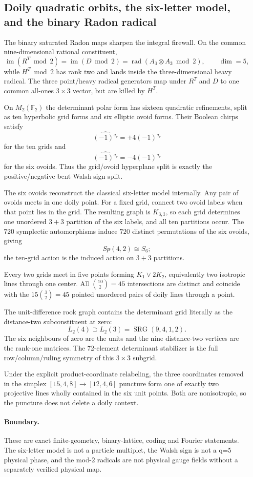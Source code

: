 \subsection*{Doily quadratic orbits, the six-letter model, and the binary Radon radical}

The binary saturated Radon maps sharpen the integral firewall. On the common
nine-dimensional rational constituent,
\[
\operatorname{im}(R^T\bmod2)=\operatorname{im}(D\bmod2)
=\operatorname{rad}(A_3\otimes A_3\bmod2),\qquad \dim=5,
\]
while $H^T\bmod2$ has rank two and lands inside the three-dimensional heavy
radical. The three point/heavy radical generators map under $R^T$ and $D$ to
one common all-ones $3\times3$ vector, but are killed by $H^T$.

On $M_2(\mathbb F_2)$ the determinant polar form has sixteen quadratic
refinements, split as ten hyperbolic grid forms and six elliptic ovoid forms.
Their Boolean chirps satisfy
\[
\widehat{(-1)^{q_v}}=+4(-1)^{q_v}
\]
for the ten grids and
\[
\widehat{(-1)^{q_v}}=-4(-1)^{q_v}
\]
for the six ovoids. Thus the grid/ovoid hyperplane split is exactly the
positive/negative bent-Walsh sign split.

The six ovoids reconstruct the classical six-letter model internally. Any pair
of ovoids meets in one doily point. For a fixed grid, connect two ovoid labels
when that point lies in the grid. The resulting graph is $K_{3,3}$, so each
grid determines one unordered $3+3$ partition of the six labels, and all ten
partitions occur. The $720$ symplectic automorphisms induce $720$ distinct
permutations of the six ovoids, giving
\[
\boxed{Sp(4,2)\cong S_6};
\]
the ten-grid action is the induced action on $3+3$ partitions.

Every two grids meet in five points forming $K_1\vee2K_2$, equivalently two
isotropic lines through one center. All $\binom{10}{2}=45$ intersections are
distinct and coincide with the $15\binom32=45$ pointed unordered pairs of
doily lines through a point.

The unit-difference rook graph contains the determinant grid literally as the
distance-two subconstituent at zero:
\[
L_2(4)\supset L_2(3)=\operatorname{SRG}(9,4,1,2).
\]
The six neighbours of zero are the units and the nine distance-two vertices
are the rank-one matrices. The $72$-element determinant stabilizer is the full
row/column/ruling symmetry of this $3\times3$ subgrid.

Under the explicit product-coordinate relabeling, the three coordinates
removed in the simplex $[15,4,8]\to[12,4,6]$ puncture form one of exactly two
projective lines wholly contained in the six unit points. Both are
nonisotropic, so the puncture does not delete a doily context.

\paragraph{Boundary.}
These are exact finite-geometry, binary-lattice, coding and Fourier statements.
The six-letter model is not a particle multiplet, the Walsh sign is not a q=5
physical phase, and the mod-$2$ radicals are not physical gauge fields without
a separately verified physical map.

